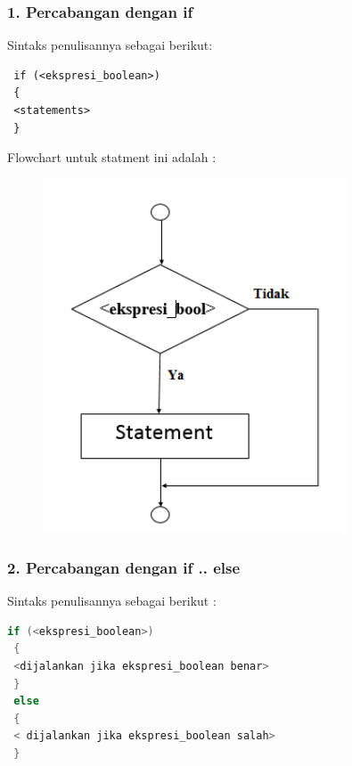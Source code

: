 \subsubsection{1. Percabangan dengan if}\label{percabangan-dengan-if}

Sintaks penulisannya sebagai berikut:

\begin{verbatim}
 if (<ekspresi_boolean>)
 {
 <statements>
 }
\end{verbatim}

Flowchart untuk statment ini adalah :

\begin{figure}[htbp]
\centering
\includegraphics[width=0.8\textwidth]{images/capture2-4.png}
\caption{}
\end{figure}

\subsubsection{2. Percabangan dengan if ..
else}\label{percabangan-dengan-if-..-else}

Sintaks penulisannya sebagai berikut :

\begin{lstlisting}[language=c++]
 if (<ekspresi_boolean>)
 {
 <dijalankan jika ekspresi_boolean benar>
 }
 else
 {
 < dijalankan jika ekspresi_boolean salah>
 }
\end{lstlisting}

